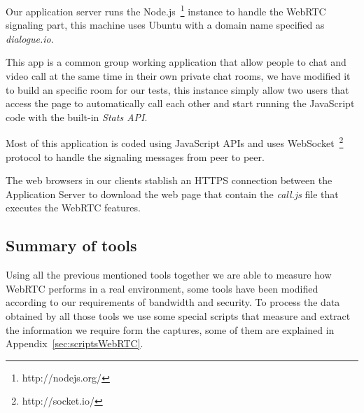 Our application server runs the Node.js~\footnote{http://nodejs.org/} instance to handle the WebRTC signaling part, this machine uses Ubuntu with a domain name specified as {\it dialogue.io}. 

This app is a common group working application that allow people to chat and video call at the same time in their own private chat rooms, we have modified it to build an specific room for our tests, this instance simply allow two users that access the page to automatically call each other and start running the JavaScript code with the built-in {\it Stats API}.

Most of this application is coded using JavaScript APIs and uses WebSocket~\footnote{http://socket.io/} protocol to handle the signaling messages from peer to peer. 

The web browsers in our clients stablish an HTTPS connection between the Application Server to download the web page that contain the {\it call.js} file that executes the WebRTC features.

\subsection{Summary of tools}

Using all the previous mentioned tools together we are able to measure how WebRTC performs in a real environment, some tools have been modified according to our requirements of bandwidth and security. To process the data obtained by all those tools we use some special scripts that measure and extract the information we require form the captures, some of them are explained in Appendix~\ref{sec:scriptsWebRTC}.